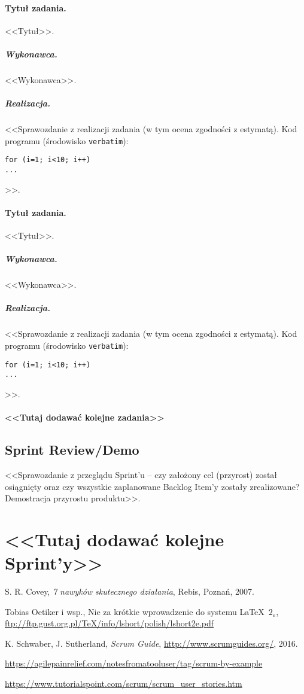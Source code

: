 \documentclass[a4paper]{article}
\begin{document}
\paragraph{Tytuł zadania.} <<Tytuł>>.
\subparagraph{Wykonawca.} <<Wykonawca>>.
\subparagraph{Realizacja.} <<Sprawozdanie z realizacji zadania (w tym ocena zgodności z estymatą). Kod programu (środowisko \texttt{verbatim}): \begin{verbatim}
for (i=1; i<10; i++)
...
\end{verbatim}>>.

\paragraph{Tytuł zadania.} <<Tytuł>>.
\subparagraph{Wykonawca.} <<Wykonawca>>.
\subparagraph{Realizacja.} <<Sprawozdanie z realizacji zadania (w tym ocena zgodności z estymatą). Kod programu (środowisko \texttt{verbatim}): \begin{verbatim}
for (i=1; i<10; i++)
...
\end{verbatim}>>.

\paragraph{<<Tutaj dodawać kolejne zadania>>}


\subsection{Sprint Review/Demo}
<<Sprawozdanie z przeglądu Sprint'u -- czy założony cel (przyrost) został osiągnięty oraz czy wszystkie zaplanowane Backlog Item'y zostały zrealizowane? Demostracja przyrostu produktu>>.

\section*{<<Tutaj dodawać kolejne Sprint'y>>}


\begin{thebibliography}{9}

 S. R. Covey, {\em 7 nawyków skutecznego działania}, Rebis, Poznań, 2007.

 Tobias Oetiker i wsp., Nie za krótkie wprowadzenie do systemu \LaTeX  \ $2_\varepsilon$, \url{ftp://ftp.gust.org.pl/TeX/info/lshort/polish/lshort2e.pdf}

 K. Schwaber, J. Sutherland, {\em Scrum Guide}, \url{http://www.scrumguides.org/}, 2016.

 \url{https://agilepainrelief.com/notesfromatooluser/tag/scrum-by-example}

 \url{https://www.tutorialspoint.com/scrum/scrum_user_stories.htm}

\end{thebibliography}
\end{document}
